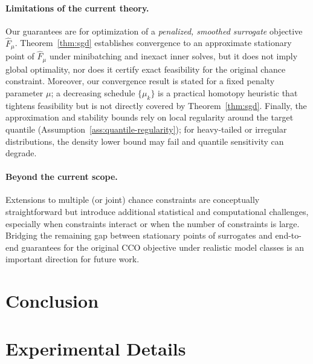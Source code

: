 \documentclass{uai2026} %
\newif\ifdraft
\newcommand{\plan}[1]{%
  \ifdraft
    \paragraph{Draft plan.}#1
  \fi
}
\theoremstyle{plain}
\theoremstyle{definition}
\begin{document}
\paragraph{Limitations of the current theory.}
Our guarantees are for optimization of a \emph{penalized, smoothed surrogate} objective $\widehat F_\mu$.
Theorem~\ref{thm:sgd} establishes convergence to an approximate stationary point of $\widehat F_\mu$ under minibatching and inexact inner solves, but it does not imply global optimality, nor does it certify exact feasibility for the original chance constraint.
Moreover, our convergence result is stated for a fixed penalty parameter $\mu$; a decreasing schedule $\{\mu_k\}$ is a practical homotopy heuristic that tightens feasibility but is not directly covered by Theorem~\ref{thm:sgd}.
Finally, the approximation and stability bounds rely on local regularity around the target quantile (Assumption~\ref{ass:quantile-regularity}); for heavy-tailed or irregular distributions, the density lower bound may fail and quantile sensitivity can degrade.

\paragraph{Beyond the current scope.}
Extensions to multiple (or joint) chance constraints are conceptually straightforward but introduce additional statistical and computational challenges, especially when constraints interact or when the number of constraints is large.
Bridging the remaining gap between stationary points of surrogates and end-to-end guarantees for the original CCO objective under realistic model classes is an important direction for future work.

\section{Conclusion}\label{sec:conclusion}
\plan{
\begin{itemize}
  \item Restate core idea: scalar inner problem + hypergradients + penalty.
  \item Summarize empirical takeaways.
  \item Roadmap: modern AI experiment (robust classification under random corruptions), multi-constraint extension.
\end{itemize}
}


\onecolumn
\appendix
\section{Experimental Details}\label{app:exp-details}
\end{document}
